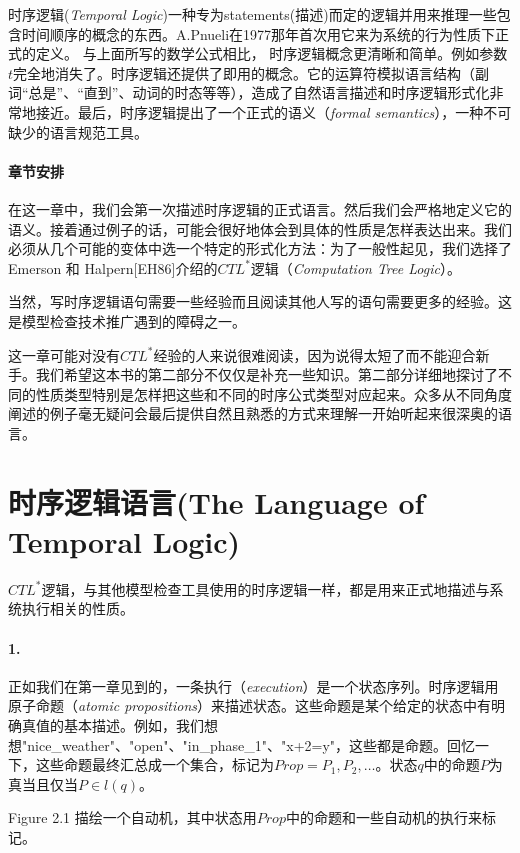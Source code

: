 \documentclass{book}
\begin{document}
    时序逻辑({\itshape Temporal Logic})一种专为statements(描述)而定的逻辑并用来推理一些包含时间顺序的概念的东西。A.Pnueli在1977那年首次用它来为系统的行为性质下正式的定义。 与上面所写的数学公式相比， 时序逻辑概念更清晰和简单。例如参数$t$完全地消失了。时序逻辑还提供了即用的概念。它的运算符模拟语言结构（副词“总是”、“直到”、动词的时态等等），造成了自然语言描述和时序逻辑形式化非常地接近。最后，时序逻辑提出了一个正式的语义（{\itshape formal semantics}），一种不可缺少的语言规范工具。

    \paragraph{章节安排} 在这一章中，我们会第一次描述时序逻辑的正式语言。然后我们会严格地定义它的语义。接着通过例子的话，可能会很好地体会到具体的性质是怎样表达出来。我们必须从几个可能的变体中选一个特定的形式化方法：为了一般性起见，我们选择了Emerson 和 Halpern[EH86]介绍的$CTL^*$逻辑（{\itshape Computation Tree Logic}）。

    当然，写时序逻辑语句需要一些经验而且阅读其他人写的语句需要更多的经验。这是模型检查技术推广遇到的障碍之一。

    这一章可能对没有$CTL^*$经验的人来说很难阅读，因为说得太短了而不能迎合新手。我们希望这本书的第二部分不仅仅是补充一些知识。第二部分详细地探讨了不同的性质类型特别是怎样把这些和不同的时序公式类型对应起来。众多从不同角度阐述的例子毫无疑问会最后提供自然且熟悉的方式来理解一开始听起来很深奥的语言。

    \section{时序逻辑语言(The Language of Temporal Logic)}

    \quad $CTL^*$逻辑，与其他模型检查工具使用的时序逻辑一样，都是用来正式地描述与系统执行相关的性质。

    \paragraph{1.} 正如我们在第一章见到的，一条执行（{\itshape execution}）是一个状态序列。时序逻辑用原子命题（{\itshape atomic propositions}）来描述状态。这些命题是某个给定的状态中有明确真值的基本描述。例如，我们想想"nice\_weather"、"open"、"in\_phase\_1"、"x+2=y"，这些都是命题。回忆一下，这些命题最终汇总成一个集合，标记为$Prop={P_1,P_2,\dots}$。状态$q$中的命题$P$为真当且仅当$P \in l(q)$。

    Figure 2.1 描绘一个自动机，其中状态用$Prop$中的命题和一些自动机的执行来标记。
\end{document}
